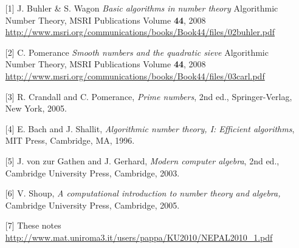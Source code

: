 \documentclass[landscape]{powersem} %
\newcommand{\heading}[1]{%
 \begin{center}
  \Ovalbox{{#1}}%
 \end{center}
 \vspace{1ex minus 1ex}}
\begin{document}
\begin{slide}
\heading{\textcolor{red}{References for this course}}
\vspace*{-2mm}\small{\begin{itemize}
 \item[\mbox{[1]}] J. Buhler \& S. Wagon \textit{Basic algorithms in number theory} Algorithmic Number Theory,
MSRI Publications
Volume \textbf{44}, 2008
{\small \url{http://www.msri.org/communications/books/Book44/files/02buhler.pdf}
\href{http://www.msri.org/communications/books/Book44/files/02buhler.pdf}{}}
\item[\mbox{[2]}] C. Pomerance \textit{Smooth numbers and the quadratic sieve}
Algorithmic Number Theory,
MSRI Publications
Volume \textbf{44}, 2008
{\small \url{http://www.msri.org/communications/books/Book44/files/03carl.pdf}
\href{http://www.msri.org/communications/books/Book44/files/03carl.pdf}{}}
\item[\mbox{[3]}] R. Crandall and C. Pomerance, \textit{Prime numbers}, 2nd
ed., Springer-Verlag, New York, 2005.
\item[\mbox{[4]}] E. Bach and J. Shallit, \textit{Algorithmic number theory, I: Efficient
algorithms}, MIT Press, Cambridge, MA, 1996.
\item[\mbox{[5]}] J. von zur Gathen and J. Gerhard, \textit{Modern computer
algebra}, 2nd ed., Cambridge University Press, Cambridge, 2003.
\item[\mbox{[6]}] V. Shoup, \textit{A computational introduction to number theory and algebra,}
Cambridge University Press, Cambridge, 2005.
\item[\mbox{[7]}] 
These notes \vspace*{-2mm} 
{\small \url{http://www.mat.uniroma3.it/users/pappa/KU2010/NEPAL2010_1.pdf}
\href{http://www.mat.uniroma3.it/users/pappa/KU2010/NEPAL2010_1.pdf}{}}
\end{itemize}}
\end{slide}
\end{document}
